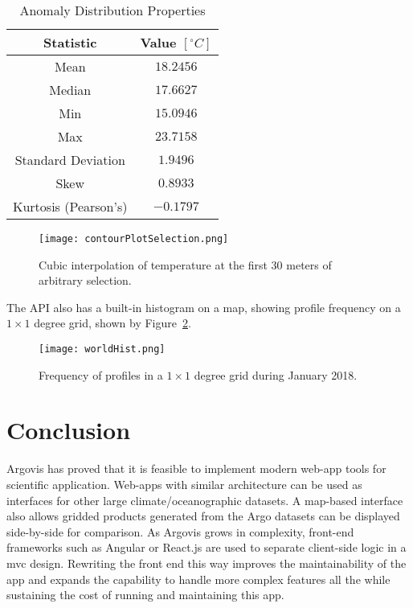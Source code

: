 \begin{table}[hbt]
\centering
\caption{Anomaly Distribution Properties \label{tbl:tempHist}}
{\begin{tabular}{|c|c|}
\hline
\textbf{Statistic} & \textbf{Value} $[^\circ C]$
\\ \hline
Mean\hphantom{00} & \hphantom{0}$18.2456$
\\ \hline
Median\hphantom{00} & \hphantom{0}$17.6627$
\\ \hline
Min\hphantom{00} & \hphantom{0}$15.0946$
\\ \hline
Max\hphantom{00} & \hphantom{0}$23.7158$
\\ \hline
Standard Deviation\hphantom{00} & \hphantom{0}$1.9496$
\\ \hline
Skew\hphantom{00} & $0.8933$
\\ \hline
Kurtosis (Pearson's) \hphantom{00} & $-0.1797$
\\ \hline
\end{tabular} }
\end{table}

\begin{figure}[H]
\centering
\begin{minipage}{4in}
\texttt{[image: contourPlotSelection.png]}
\caption{\label{fig:contourPlotSelection}Cubic interpolation of temperature at the first 30 meters of arbitrary selection.}
\end{minipage}
\end{figure}

The API also has a built-in histogram on a map, showing profile frequency on a $1\times 1$ degree grid, shown by Figure~\ref{fig:worldHist}.

\begin{figure}[H]
\centering
\begin{minipage}{6in}
\texttt{[image: worldHist.png]}
\caption{\label{fig:worldHist}Frequency of profiles in a $1\times 1$ degree grid during January 2018.}
\end{minipage}
\end{figure}

\section{Conclusion}

Argovis has proved that it is feasible to implement modern web-app tools for scientific application. Web-apps with similar architecture can be used as interfaces for other large climate/oceanographic datasets. A map-based interface also allows gridded products generated from the Argo datasets can be displayed side-by-side for comparison. As Argovis grows in complexity, front-end frameworks such as Angular or React.js are used to separate client-side logic in a \gls{mvc} design. Rewriting the front end this way improves the maintainability of the app and expands the capability to handle more complex features all the while sustaining the cost of running and maintaining this app.

